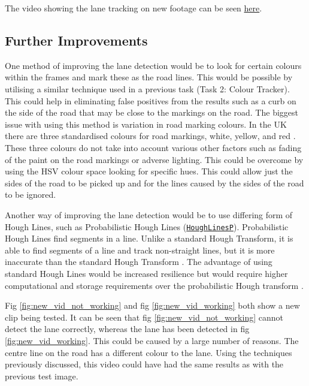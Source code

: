\documentclass[conference]{IEEEtran}
\begin{document}
The video showing the lane tracking on new footage can be seen \href{https://youtu.be/3RjcQkaabNI}{here}.


\subsection{Further Improvements}

One method of improving the lane detection would be to look for certain colours within the frames and mark these as the road lines. This would be possible by utilising a similar technique used in a previous task (Task 2: Colour Tracker). This could help in eliminating false positives from the results such as a curb on the side of the road that may be close to the markings on the road. The biggest issue with using this method is variation in road marking colours. In the UK there are three standardised colours for road markings, white, yellow, and red \cite{road_markings}. These three colours do not take into account various other factors such as fading of the paint on the road markings or adverse lighting. This could be overcome by using the HSV colour space looking for specific hues. This could allow just the sides of the road to be picked up and  for the lines caused by the sides of the road to be ignored. 

Another way of improving the lane detection would be to use differing form of Hough Lines, such as Probabilistic Hough Lines (\href{https://docs.opencv.org/4.x/dd/d1a/group__imgproc__feature.html#ga8618180a5948286384e3b7ca02f6feeb}{\texttt{HoughLinesP}}). Probabilistic Hough Lines find segments in a line. Unlike a standard Hough Transform, it is able to find segments of a line and track non-straight lines, but it is more inaccurate than the standard Hough Transform \cite{hough_book}. The advantage of using standard Hough Lines would be increased resilience but would require higher computational and storage requirements over the probabilistic Hough transform \cite{improvement_to_hough_lines}. 

Fig \ref{fig:new_vid_not_working} and fig \ref{fig:new_vid_working} both show a new clip being tested. It can be seen that fig \ref{fig:new_vid_not_working} cannot detect the lane correctly, whereas the lane has been detected in fig \ref{fig:new_vid_working}. This could be caused by a large number of reasons. The centre line on the road has a different colour to the lane. Using the techniques previously discussed, this video could have had the same results as with the previous test image. 
\end{document}

